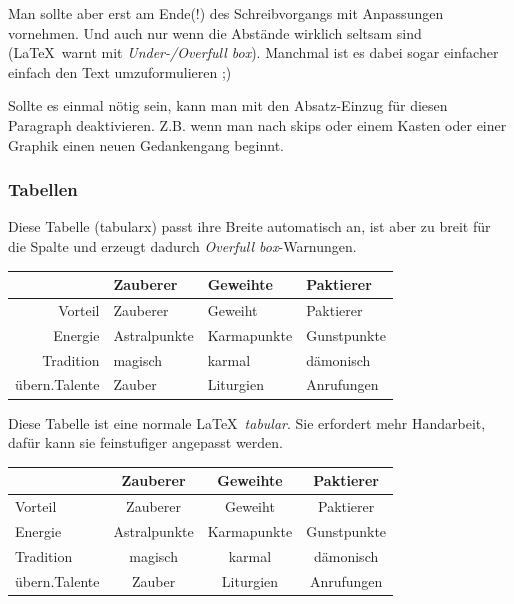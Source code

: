 \begin{multicols}{2}[        %
		]
Man sollte aber erst am Ende(!) des Schreibvorgangs mit  Anpassungen vornehmen. Und auch nur wenn die Abstände wirklich seltsam sind (\LaTeX\ warnt mit \emph{Under-/Overfull box}). Manchmal ist es dabei sogar einfacher einfach den Text umzuformulieren ;)

Sollte es einmal nötig sein, kann man mit  den Absatz-Einzug für diesen Paragraph deaktivieren. Z.B. wenn man nach skips oder einem Kasten oder einer Graphik einen neuen Gedankengang beginnt.


\subsubsection{Tabellen}
Diese Tabelle (tabularx) passt ihre Breite automatisch an, ist aber zu breit für die Spalte und erzeugt dadurch \emph{Overfull box}-Warnungen.

\begin{tabularx}{\linewidth}{rXXX}
			  & \textbf{Zauberer} & \textbf{Geweihte} & \textbf{Paktierer} \\
	\hline
	Vorteil	  & Zauberer	 & Geweiht	   & Paktierer \\   
	Energie	  & Astralpunkte & Karmapunkte & Gunstpunkte \\ 
	Tradition & magisch	     & karmal	   & dämonisch \\   
übern.Talente & Zauber	     & Liturgien   & Anrufungen \\  
\end{tabularx}

\bigskip

Diese Tabelle ist eine normale \LaTeX\ \emph{tabular}. Sie erfordert mehr Handarbeit, dafür kann sie feinstufiger angepasst werden.


\begin{tabular}{l@{ }c@{\ }c@{\ }c}
			  & \textbf{Zauberer} & \textbf{Geweihte} & \textbf{Paktierer} \\
	\hline
	Vorteil	  & Zauberer	 & Geweiht	   & Paktierer \\
	Energie	  & Astralpunkte & Karmapunkte & Gunstpunkte \\
	Tradition & magisch	     & karmal	   & dämonisch \\
übern.Talente & Zauber	     & Liturgien   & Anrufungen \\
\end{tabular}
\end{multicols}

